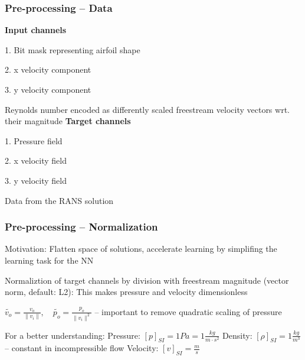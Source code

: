\begin{frame}
    \frametitle{Pre-processing -- Data}
\vspace*{0.8cm}

\begin{multicols}{2}
    \textbf{Input channels}\newline

1. Bit mask representing airfoil shape
  
2. x velocity component
   
3. y velocity component

Reynolds number encoded as differently scaled \newline freestream velocity vectors wrt. their magnitude
    \vfill\columnbreak
    \textbf{Target channels}\newline

1. Pressure field
  
2. x velocity field
   
3. y velocity field

Data from the RANS solution
\end{multicols}

\end{frame}
\clearpage

\begin{frame}
    \frametitle{Pre-processing -- Normalization}
\vspace*{0.8cm}

Motivation: Flatten space of solutions, accelerate learning by simplifing the learning task for the NN

Normaliztion of target channels by division with freestream magnitude (vector norm, default: L2):\newline
This makes pressure and velocity dimensionless

$\tilde{v_{o}} = \frac{v_{o}}{\|v_{i}\|}, \quad \tilde{p_{o}} = \frac{p_{o}}{\|v_{i}\|^{2}}$ -- important to remove quadratic scaling of pressure

For a better understanding: \newline
Pressure: $[p]_{SI} = 1 Pa = 1 \frac{kg}{m \cdot s^2}$ \newline
Density: $[\rho]_{SI} = 1 \frac{kg}{m^3}$ -- constant in incompressible flow \newline
Velocity: $[v]_{SI} = \frac{m}{s}$ \newline

\end{frame}
\clearpage

